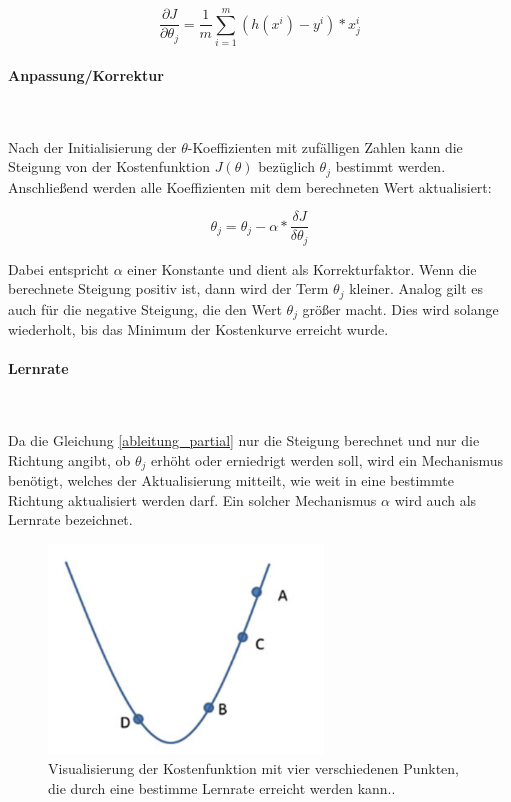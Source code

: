 \begin{equation}
\label{ableitung_partial}
\frac{\partial J}{\partial \theta_j} = \frac{1}{m}\sum_{i=1}^{m}(h(x^i) - y^i)*x_j^i
\end{equation}

\paragraph{Anpassung/Korrektur}
~\newline



Nach der Initialisierung der $\theta$-Koeffizienten mit zufälligen Zahlen kann die Steigung von der Kostenfunktion $J(\theta)$ bezüglich $\theta_j$ bestimmt werden. Anschließend werden alle Koeffizienten mit dem berechneten Wert aktualisiert:

\begin{equation}
\label{}
\theta_j = \theta_j - \alpha*\frac{\delta J}{\delta\theta_j}
\end{equation}

Dabei entspricht $\alpha$ einer Konstante und dient als Korrekturfaktor. Wenn die berechnete Steigung positiv ist, dann wird der Term $\theta_j$ kleiner. Analog gilt es auch für die negative Steigung, die den Wert $\theta_j$ größer macht. Dies wird solange wiederholt, bis das Minimum der Kostenkurve erreicht wurde. 


\paragraph{Lernrate}
~\newline


Da die Gleichung \ref{ableitung_partial} nur die Steigung berechnet und nur die Richtung angibt, ob $\theta_j$ erhöht oder erniedrigt werden soll, wird ein Mechanismus benötigt, welches der Aktualisierung mitteilt, wie weit in eine bestimmte Richtung aktualisiert werden darf. Ein solcher Mechanismus $\alpha$ wird auch als Lernrate bezeichnet.

\begin{figure}[h!]
	\centering
	\includegraphics[width=0.65\textwidth]{bilder/quadratic_func_labeled.png}
	\caption{Visualisierung der Kostenfunktion mit vier verschiedenen Punkten, die durch eine bestimme Lernrate erreicht werden kann.\cite{IntroML}.}
	\label{lernrate}
\end{figure}



